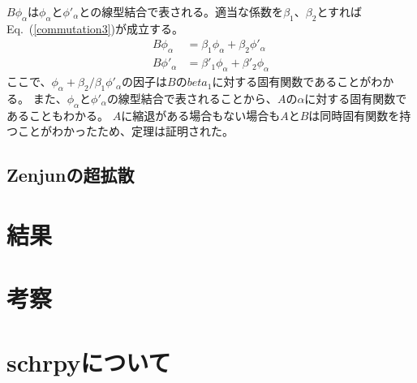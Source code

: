 \documentclass[autodetect-engine,dvipdfmx-if-dvi,ja=standard,a4paper,layout=v2]{bxjsreport}
\newcommand{\eref}[1]{Eq.~(\ref{#1})}
\begin{document}
    $B\phi_\alpha$は$\phi_\alpha$と$\phi'_\alpha$との線型結合で表される。適当な係数を$\beta_1$、$\beta_2$とすれば\eref{commutation3}が成立する。\begin{align}
      B\phi_\alpha &= \beta_1\phi_\alpha + \beta_2\phi'_\alpha\\
      B\phi'_\alpha &= \beta'_1\phi_\alpha + \beta'_2\phi_\alpha
    \end{align}
    ここで、$\phi_\alpha+\beta_2/\beta_1\phi'_\alpha$の因子は$B$の$beta_1$に対する固有関数であることがわかる。
    また、$\phi_\alpha$と$\phi'_\alpha$の線型結合で表されることから、$A$の$\alpha$に対する固有関数であることもわかる。
    $A$に縮退がある場合もない場合も$A$と$B$は同時固有関数を持つことがわかったため、定理は証明された。
    \section{Zenjunの超拡散}
    \chapter{結果}
    \chapter{考察}
    \chapter{schrpyについて}
\end{document}
